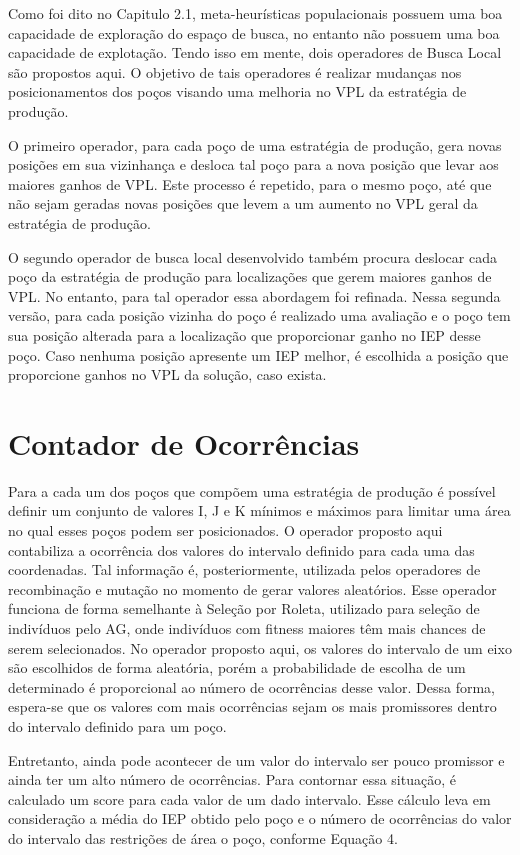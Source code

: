 Como foi dito no Capitulo 2.1, meta-heurísticas populacionais possuem uma boa capacidade de exploração do espaço de busca, no entanto não possuem uma boa capacidade de explotação. Tendo isso em mente, dois operadores de Busca Local são propostos aqui. O objetivo de tais operadores é realizar mudanças nos posicionamentos dos poços visando uma melhoria no VPL da estratégia de produção.

O primeiro operador, para cada poço de uma estratégia de produção, gera novas posições em sua vizinhança e desloca tal poço para a nova posição que levar aos maiores ganhos de VPL. Este processo é repetido, para o mesmo poço, até que não sejam geradas novas posições que levem a um aumento no VPL geral da estratégia de produção.

O segundo operador de busca local desenvolvido também procura deslocar cada poço da estratégia de produção para localizações que gerem maiores ganhos de VPL. No entanto, para tal operador essa abordagem foi refinada. Nessa segunda versão, para cada posição vizinha do poço é realizado uma avaliação e o poço tem sua posição alterada para a localização que proporcionar ganho no IEP desse poço. Caso nenhuma posição apresente um IEP melhor, é escolhida a posição que proporcione ganhos no VPL da solução, caso exista. 

\section{Contador de Ocorrências}
  
Para a cada um dos poços que compõem uma estratégia de produção é possível definir um conjunto de valores I, J e K mínimos e máximos para limitar uma área no qual esses poços podem ser posicionados. O operador proposto aqui contabiliza a ocorrência dos valores do intervalo definido para cada uma das coordenadas. Tal informação é, posteriormente, utilizada pelos operadores de recombinação e mutação no momento de gerar valores aleatórios. Esse operador funciona de forma semelhante à Seleção por Roleta, utilizado para seleção de indivíduos pelo AG, onde indivíduos com fitness maiores têm mais chances de serem selecionados. No operador proposto aqui, os valores do intervalo de um eixo são escolhidos de forma aleatória, porém a probabilidade de escolha de um determinado é proporcional ao número de ocorrências desse valor. Dessa forma, espera-se que os valores com mais ocorrências sejam os mais promissores dentro do intervalo definido para um poço.

Entretanto, ainda pode acontecer de um valor do intervalo ser pouco promissor e ainda ter um alto número de ocorrências. Para contornar essa situação, é calculado um score para cada valor de um dado intervalo. Esse cálculo leva em consideração a média do IEP obtido pelo poço e o número de ocorrências do valor do intervalo das restrições de área o poço, conforme Equação 4.

